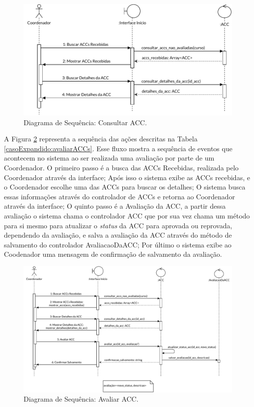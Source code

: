 \begin{figure}[H]
    \centering
    \includegraphics[width=\textwidth]{dados/figuras/Proposta/DiagramasDeSequencia/Consultar ACC.pdf}
    \caption{Diagrama de Sequência: Consultar ACC.}
    \label{diagSeq:coordConsultarACC}
\end{figure}

A Figura \ref{diagSeq:avaliarRequisicaoACC} representa a sequência das ações descritas na Tabela \ref{casoExpandido:avaliarACCs}. Esse fluxo mostra a sequência de eventos que acontecem no sistema ao ser realizada uma avaliação por parte de um Coordenador. O primeiro passo é a busca das ACCs Recebidas, realizada pelo Coordenador através da interface; Após isso o sistema exibe as ACCs recebidas, e o Coordenador escolhe uma das ACCs para buscar os detalhes; O sistema busca essas informações através do controlador de ACCs e retorna ao Coordenador através da interface; O quinto passo é a Avaliação da ACC, a partir dessa avaliação o sistema chama o controlador ACC que por sua vez chama um método para si mesmo para atualizar o \textit{status} da ACC para aprovada ou reprovada, dependendo da avaliação, e salva a avaliação da ACC através do método de salvamento do controlador AvaliacaoDaACC; Por último o sistema exibe ao Coodenador uma mensagem de confirmação de salvamento da avaliação.

\begin{figure}[H]
    \centering
    \includegraphics[width=\textwidth]{dados/figuras/Proposta/DiagramasDeSequencia/Avaliar Requisição de ACC.pdf}
    \caption{Diagrama de Sequência: Avaliar ACC.}
    \label{diagSeq:avaliarRequisicaoACC}
\end{figure}

